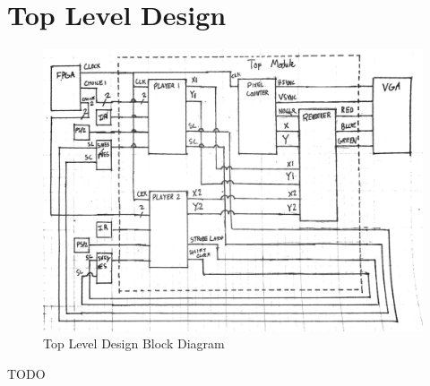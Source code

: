 \documentclass[]{article}
\begin{document}
\section{Top Level Design}
\begin{figure}[H]\centering
    \includegraphics[width=\linewidth]{figures/Top_Block.jpg}
    \caption{Top Level Design Block Diagram} 
    \label{fig:TopLevelDesign}
\end{figure}
TODO
\end{document}
